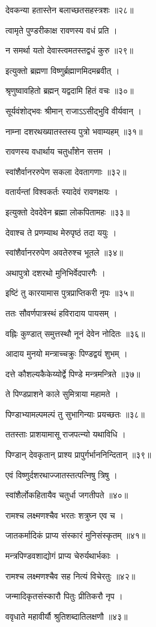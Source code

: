 देवकन्या हतास्तेन बलाच्छतसहस्त्रशः ॥२८॥

त्वामृते पुण्डरीकाक्ष रावणस्य वधं प्रति ।

न समर्था यतो देवास्त्वमतस्तद्वधं कुरु ॥२९॥

इत्युक्तो ब्रह्मणा विष्णुर्ब्रह्माणमिदमब्रवीत् ।

श्रृणुष्वावहितो ब्रह्मन् यद्वदामि हितं वचः ॥३०॥

सूर्यवंशोद्भवः श्रीमान् राजाऽऽसीद्भुवि वीर्यवान् ।

नाम्ना दशरथख्यातस्तस्य पुत्रो भवाम्यहम् ॥३१॥

रावणस्य वधार्थाय चतुर्धांशेन सत्तम ।

स्वांशैर्वानररुपेण सकला देवतागणाः ॥३२॥

वतार्यन्तां विश्वकर्तः स्यादेवं रावणक्षयः ।

इत्युक्तो देवदेवेन ब्रह्मा लोकपितामहः ॥३३॥

देवाश्च ते प्रणम्याथ मेरुपृष्ठं तदा ययुः ।

स्वांशैर्वानररुपेण अवतेरुश्च भूतले ॥३४॥

अथापुत्रो दशरथो मुनिभिर्वेदपारगैः ।

इष्टिं तु कारयामास पुत्रप्राप्तिकरी नृपः ॥३५॥

ततः सौवर्णपात्रस्थं हविरादाय पायसम् ।

वह्निः कुण्डात् समुत्तस्थौ नूनं देवेन नोदितः ॥३६॥

आदाय मुनयो मन्त्राच्चक्रुः पिण्डद्वयं शुभम् ।

दत्ते कौशल्यकैकेय्योर्द्वे पिण्डे मन्त्रमन्त्रिते ॥३७॥

ते पिण्डप्राशने काले सुमित्राया महामते ।

पिण्डाभ्यामल्पमल्पं तु सुभागिन्याः प्रयच्छतः ॥३८॥

ततस्ताः प्राशयामासू राजपत्न्यो यथाविधि ।

पिण्डान् देवकृतान् प्राश्य प्रापुर्गर्भाननिन्दितान् ॥३९॥

एवं विष्णुर्दशरथाज्जातस्तत्पत्निषु त्रिषु ।

स्वांशैर्लोकहितायैव चतुर्धा जगतीपते ॥४०॥

रामश्च लक्ष्मणश्चैव भरतः शत्रुघ्न एव च ।

जातकर्मादिकं प्राप्य संस्कारं मुनिसंस्कृतम् ॥४१॥

मन्त्रपिण्डवशाद्योगं प्राप्य चेरुर्यथार्भकाः ।

रामश्च लक्ष्मणश्चैव सह नित्यं विचेरतुः ॥४२॥

जन्मादिकृतसंस्कारौ पितुः प्रीतिकरौ नृप ।

ववृधाते महावीर्यौ श्रुतिशब्दातिलक्षणौ ॥४३॥

